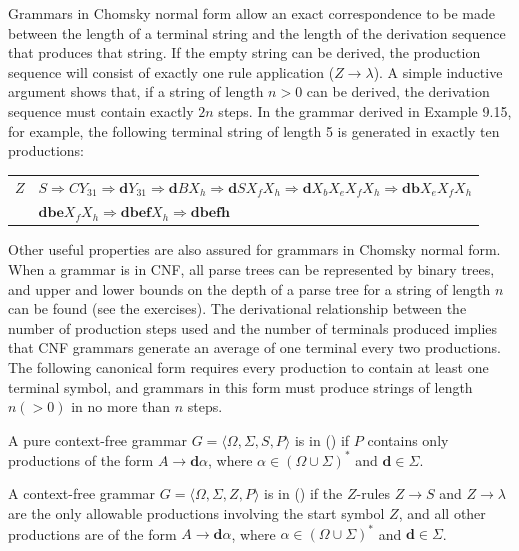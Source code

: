 Grammars in Chomsky normal form allow an exact correspondence to be made between
the length of a terminal string and the length of the derivation sequence that
produces that string. If the empty string can be derived, the production
sequence will consist of exactly one rule application ($Z\rightarrow\lambda$). A
simple inductive argument shows that, if a string of length $n>0$ can be derived,
the derivation sequence must contain exactly $2n$ steps. In the grammar derived
in Example 9.15, for example, the following terminal string of length 5 is
generated in exactly ten productions:
\begin{center}\begin{tabular}{r@{ $\Rightarrow$ }l}
$Z$ & $S\Rightarrow CY_{31} \Rightarrow \pmb{d}Y_{31} \Rightarrow \pmb{d}BX_h
	\Rightarrow \pmb{d}SX_fX_h \Rightarrow \pmb{d}X_bX_eX_fX_h \Rightarrow
	\pmb{db}X_eX_fX_h$ \\
& $\pmb{dbe}X_fX_h \Rightarrow \pmb{dbef}X_h \Rightarrow \pmb{dbefh}$
\end{tabular}\end{center}

Other useful properties are also assured for grammars in Chomsky normal form.
When a grammar is in CNF, all parse trees can be represented by binary trees,
and upper and lower bounds on the depth of a parse tree for a string of length
$n$ can be found (see the exercises). The derivational relationship between the
number of production steps used and the number of terminals produced implies
that CNF grammars generate an average of one terminal every two productions. The
following canonical form requires every production to contain at least one
terminal symbol, and grammars in this form must produce strings of length
$n(>0)$ in no more than $n$ steps.

\begin{dfn}\label{dfn-9.10}
A pure context-free grammar $G=\langle\Omega,\Sigma,S,P\rangle$ is in
\emph{} () if $P$ contains only 
productions of the form $A\rightarrow\pmb{d}\alpha$, where $\alpha\in(\Omega\cup
\Sigma)^*$ and $\pmb{d}\in\Sigma$.

A context-free grammar $G=\langle\Omega,\Sigma,Z,P\rangle$ is in \emph{} () if the $Z$-rules $Z\rightarrow S$ and $Z\rightarrow
\lambda$ are the only allowable productions involving the start symbol $Z$, and
all other productions are of the form $A\rightarrow\pmb{d}\alpha$, where $\alpha
\in(\Omega\cup\Sigma)^*$ and $\pmb{d}\in\Sigma$.
\end{dfn}

